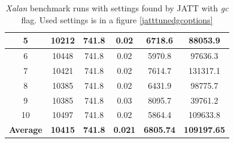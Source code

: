 \documentclass[
  digital, %
  oneside,
  notable, %
  nolof,     %
  nolot     %
]{fithesis3}
\begin{document}
\begin{table}[]
\begin{tabular}{|c|c|c|c|c|c|}
		5                & 10212                                                        & 741.8                                                                  & 0.02                                                                   & 6718.6                                                               & 88053.9                                                         \\ \hline
		6                & 10448                                                        & 741.8                                                                  & 0.02                                                                   & 5970.8                                                               & 97636.3                                                         \\ \hline
		7                & 10421                                                        & 741.8                                                                  & 0.02                                                                   & 7614.7                                                               & 131317.1                                                        \\ \hline
		8                & 10385                                                        & 741.8                                                                  & 0.02                                                                   & 6431.9                                                               & 98775.7                                                         \\ \hline
		9                & 10385                                                        & 741.8                                                                  & 0.03                                                                   & 8095.7                                                               & 39761.2                                                         \\ \hline
		10               & 10497                                                        & 741.8                                                                  & 0.02                                                                   & 5864.4                                                               & 109633.8                                                        \\ \hline
		\textbf{Average} & \textbf{10415}                                               & \textbf{741.8}                                                         & \textbf{0.021}                                                         & \textbf{6805.74}                                                     & \textbf{109197.65}                                              \\ \hline
	\end{tabular}
	\caption{\textit{Xalan} benchmark runs with settings found by JATT with \textit{gc} flag. Used settings is in a figure \ref{jatttunedgcoptions}}
	\label{jattgcresults}
\end{table}
\end{document}
